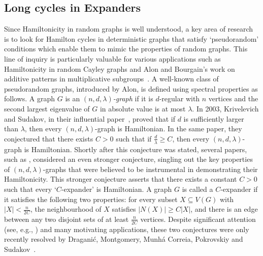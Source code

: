 \documentclass[10pt]{article}
\theoremstyle{plain}
\numberwithin{theorem}{section}
\theoremstyle{definition}
\theoremstyle{remark}
\theoremstyle{plain}
\begin{document}
\subsection{Long cycles in Expanders}

    Since Hamiltonicity in random graphs is well understood, a key area of research is to look for Hamilton cycles in deterministic graphs that satisfy `pseudorandom' conditions which enable them to mimic the properties of random graphs. This line of inquiry is particularly valuable for various applications such as Hamiltonicity in random Cayley graphs and Alon and Bourgain’s work on additive patterns in multiplicative subgroups~\cite{alon2014additive}. A well-known class of pseudorandom graphs, introduced by Alon, is defined using spectral properties as follows. A graph $G$ is an \emph{$(n, d, \lambda)$-graph} if it is $d$-regular with $n$ vertices and the second largest eigenvalue of $G$ in absolute value is at most $\lambda$. In 2003, Krivelevich and Sudakov, in their influential paper~\cite{krivelevich2003sparse}, proved that if $d$ is sufficiently larger than $\lambda$, then every $(n, d, \lambda)$-graph is Hamiltonian.  In the same paper, they conjectured that there exists $C > 0$ such that if $\frac{d}{\lambda} \ge C$, then every $(n, d, \lambda)$-graph is Hamiltonian. Shortly after this conjecture was stated, several papers, such as \cite{brandt2006global}, considered an even stronger conjecture, singling out the key properties of $(n, d, \lambda)$-graphs that were believed to be instrumental in demonstrating their Hamiltonicity.  This stronger conjecture asserts that there exists a constant $C > 0$ such that every `$C$-expander' is Hamiltonian. A graph $G$ is called a $C$-expander if it satisfies the following two properties: for every subset $X \subseteq V(G)$ with $|X| < \frac{n}{2C}$, the neighbourhood of $X$ satisfies $|N(X)| \geq C|X|$, and there is an edge between any two disjoint sets of at least $\frac{n}{2C}$ vertices. Despite significant attention (see, e.g., \cite{brandt2006global,hefetz2009hamilton, krivelevich2006pseudo, krivelevich2011number, GlockMCS}) and many motivating applications, these two conjectures were only recently resolved by Dragani{\'c}, Montgomery, Munh\'a Correia,  Pokrovskiy and Sudakov~\cite{draganic2024hamiltonicity}.
\end{document}
